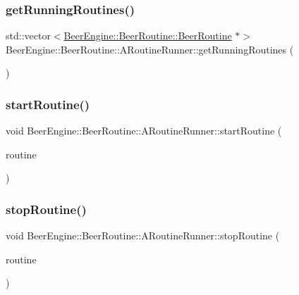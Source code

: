 \subsubsection{\texorpdfstring{get\+Running\+Routines()}{getRunningRoutines()}}
{\footnotesize\ttfamily std\+::vector$<$\mbox{\hyperlink{class_beer_engine_1_1_beer_routine_1_1_beer_routine}{Beer\+Engine\+::\+Beer\+Routine\+::\+Beer\+Routine}} $\ast$$>$ Beer\+Engine\+::\+Beer\+Routine\+::\+A\+Routine\+Runner\+::get\+Running\+Routines (\begin{DoxyParamCaption}{ }\end{DoxyParamCaption})}

\mbox{\label{class_beer_engine_1_1_beer_routine_1_1_a_routine_runner_a39c1caf6c18c8f6e2821dc490226279f}} 
\subsubsection{\texorpdfstring{start\+Routine()}{startRoutine()}}
{\footnotesize\ttfamily void Beer\+Engine\+::\+Beer\+Routine\+::\+A\+Routine\+Runner\+::start\+Routine (\begin{DoxyParamCaption}\item[{\mbox{\hyperlink{class_beer_engine_1_1_beer_routine_1_1_beer_routine}{Beer\+Engine\+::\+Beer\+Routine\+::\+Beer\+Routine}} \&}]{routine }\end{DoxyParamCaption})}

\mbox{\label{class_beer_engine_1_1_beer_routine_1_1_a_routine_runner_a3c4bff92fb1bad462946a3b48e62a44e}} 
\subsubsection{\texorpdfstring{stop\+Routine()}{stopRoutine()}}
{\footnotesize\ttfamily void Beer\+Engine\+::\+Beer\+Routine\+::\+A\+Routine\+Runner\+::stop\+Routine (\begin{DoxyParamCaption}\item[{\mbox{\hyperlink{class_beer_engine_1_1_beer_routine_1_1_beer_routine}{Beer\+Engine\+::\+Beer\+Routine\+::\+Beer\+Routine}} $\ast$}]{routine }\end{DoxyParamCaption})}

